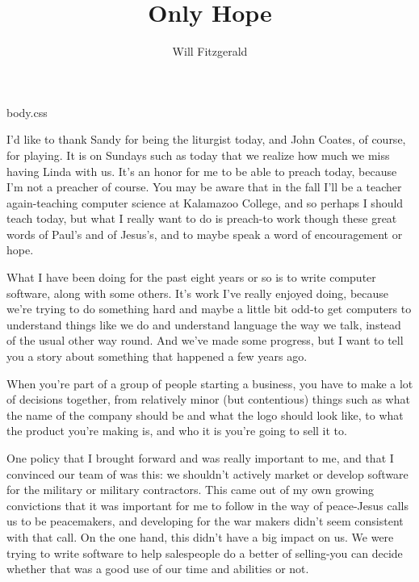 \documentclass[11pt]{article}
\begin{document}
\title{Only Hope}
\author{Will Fitzgerald}

 body.css
\maketitle

I'd like to thank Sandy for being the liturgist today, and John
Coates, of course, for playing. It is on Sundays such as today
that we realize how much we miss having Linda with us. It's an
honor for me to be able to preach today, because I'm not a
preacher of course. You may be aware that in the fall I'll be a
teacher again-teaching computer science at Kalamazoo College, and
so perhaps I should teach today, but what I really want to do is
preach-to work though these great words of Paul's and of Jesus's,
and to maybe speak a word of encouragement or hope.

What I have been doing for the past eight years or so is to write
computer software, along with some others. It's work I've really
enjoyed doing, because we're trying to do something hard and maybe
a little bit odd-to get computers to understand things like we do
and understand language the way we talk, instead of the usual
other way round. And we've made some progress, but I want to tell
you a story about something that happened a few years ago.

When you're part of a group of people starting a business, you
have to make a lot of decisions together, from relatively minor
(but contentious) things such as what the name of the company
should be and what the logo should look like, to what the product
you're making is, and who it is you're going to sell it to.

One policy that I brought forward and was really important to me,
and that I convinced our team of was this: we shouldn't actively
market or develop software for the military or military
contractors. This came out of my own growing convictions that it
was important for me to follow in the way of peace-Jesus calls us
to be peacemakers, and developing for the war makers didn't seem
consistent with that call. On the one hand, this didn't have a big
impact on us. We were trying to write software to help salespeople
do a better of selling-you can decide whether that was a good use
of our time and abilities or not.
\end{document}
